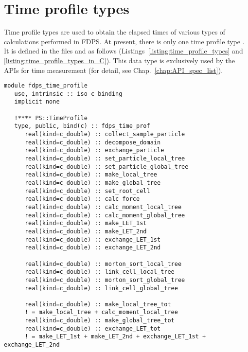 \section{Time profile types}
\label{sec:time_profile_types}
Time profile types are used to obtain the elapsed times of various types of calculations performed in FDPS. At present, there is only one time profile type . It is defined in the files  and  as follows (Listings~\ref{listing:time_profile_types} and \ref{listing:time_profile_types_in_C}). This data type is exclusively used by the APIs for time measurement (for detail, see Chap.~\ref{chap:API_spec_list}).

\begin{lstlisting}[caption=Time profile types (Fortran),label=listing:time_profile_types]
module fdps_time_profile
   use, intrinsic :: iso_c_binding
   implicit none

   !**** PS::TimeProfile
   type, public, bind(c) :: fdps_time_prof
      real(kind=c_double) :: collect_sample_particle
      real(kind=c_double) :: decompose_domain
      real(kind=c_double) :: exchange_particle
      real(kind=c_double) :: set_particle_local_tree
      real(kind=c_double) :: set_particle_global_tree
      real(kind=c_double) :: make_local_tree
      real(kind=c_double) :: make_global_tree
      real(kind=c_double) :: set_root_cell
      real(kind=c_double) :: calc_force
      real(kind=c_double) :: calc_moment_local_tree
      real(kind=c_double) :: calc_moment_global_tree
      real(kind=c_double) :: make_LET_1st
      real(kind=c_double) :: make_LET_2nd
      real(kind=c_double) :: exchange_LET_1st
      real(kind=c_double) :: exchange_LET_2nd
                                                                                                   
      real(kind=c_double) :: morton_sort_local_tree                                                
      real(kind=c_double) :: link_cell_local_tree                                                  
      real(kind=c_double) :: morton_sort_global_tree                                               
      real(kind=c_double) :: link_cell_global_tree                                                 
                                                                                                   
      real(kind=c_double) :: make_local_tree_tot                                                   
      ! = make_local_tree + calc_moment_local_tree                                                 
      real(kind=c_double) :: make_global_tree_tot                                                  
      real(kind=c_double) :: exchange_LET_tot                                                      
      ! = make_LET_1st + make_LET_2nd + exchange_LET_1st + exchange_LET_2nd                        
                                                                                                   

\end{lstlisting}
